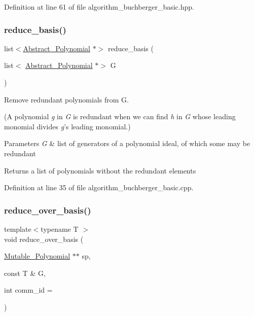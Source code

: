 Definition at line 61 of file algorithm\+\_\+buchberger\+\_\+basic.\+hpp.

\mbox{\label{group___g_b_computation_gaf4fe293e7cdc8ec2fd8b13df3318cb4a}} 
\subsubsection{\texorpdfstring{reduce\+\_\+basis()}{reduce\_basis()}}
{\footnotesize\ttfamily list$<$\hyperlink{group__polygroup_class_abstract___polynomial}{Abstract\+\_\+\+Polynomial} $\ast$$>$ reduce\+\_\+basis (\begin{DoxyParamCaption}\item[{list$<$ \hyperlink{group__polygroup_class_abstract___polynomial}{Abstract\+\_\+\+Polynomial} $\ast$$>$}]{G }\end{DoxyParamCaption})}



Remove redundant polynomials from {\ttfamily G}. 

(A polynomial {\itshape g} in {\itshape G} is redundant when we can find {\itshape h} in {\itshape G} whose leading monomial divides {\itshape g}'s leading monomial.) 
\begin{DoxyParams}{Parameters}
{\em G} & list of generators of a polynomial ideal, of which some may be redundant \\
\hline
\end{DoxyParams}
\begin{DoxyReturn}{Returns}
a list of polynomials without the redundant elements 
\end{DoxyReturn}


Definition at line 35 of file algorithm\+\_\+buchberger\+\_\+basic.\+cpp.

\mbox{\label{group___g_b_computation_ga4510be23ab1030c63d493542157141bd}} 
\subsubsection{\texorpdfstring{reduce\+\_\+over\+\_\+basis()}{reduce\_over\_basis()}}
{\footnotesize\ttfamily template$<$typename T $>$ \\
void reduce\+\_\+over\+\_\+basis (\begin{DoxyParamCaption}\item[{\hyperlink{group__polygroup_class_mutable___polynomial}{Mutable\+\_\+\+Polynomial} $\ast$$\ast$}]{sp,  }\item[{const T \&}]{G,  }\item[{int}]{comm\+\_\+id = {} }\end{DoxyParamCaption})}



